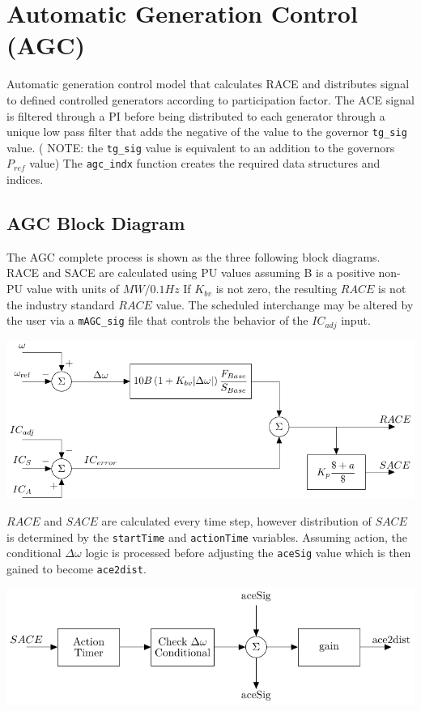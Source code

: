 \pagebreak
\section{Automatic Generation Control (AGC)}  
Automatic generation control model that calculates RACE and distributes signal to defined controlled generators according to participation factor.
The ACE signal is filtered through a PI before being distributed to each generator through a unique low pass filter that adds the negative of the value to the governor \verb|tg_sig| value.
( NOTE: the \verb|tg_sig| value is equivalent to an addition to the governors $P_{ref}$ value)
The \verb|agc_indx| function creates the required data structures and indices.


\subsection{AGC Block Diagram}
The AGC complete process is shown as the three following block diagrams.
RACE and SACE are calculated using PU values assuming B is a positive non-PU value with units of $MW/0.1Hz$
If $K_{bv}$ is not zero, the resulting $RACE$ is not the industry standard $RACE$ value.
The scheduled interchange may be altered by the user via a \verb|mAGC_sig| file that controls the behavior of the $IC_{adj}$ input.

\begin{center}
\includegraphics[width=.75\linewidth]{sections/agc/200722-AGCblockdiagram-p1}
\end{center}

$RACE$ and $SACE$ are calculated every time step, however
distribution of $SACE$ is determined by the \verb|startTime| and \verb|actionTime| variables.
Assuming action, the conditional $\Delta\omega$ logic is processed before adjusting the \verb|aceSig| value which is then gained to become \verb|ace2dist|.

\begin{center}
\includegraphics[width=.75\linewidth]{sections/agc/200722-AGCblockdiagram-p2}
\end{center}

